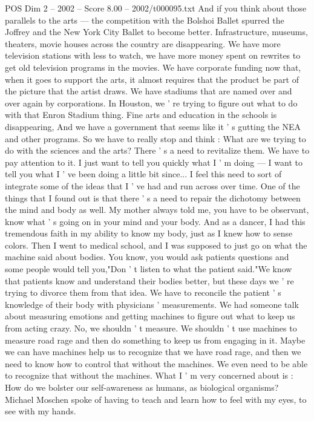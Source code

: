 \begin{textsample}{POS Dim 2 – 2002 – Score 8.00 – 2002/t000095.txt}
And if you think about those parallels to the arts — the competition with the Bolshoi Ballet spurred the Joffrey and the New York City Ballet to become better.
Infrastructure, museums, theaters, movie houses across the country are disappearing.
We have more television stations with less to watch, we have more money spent on rewrites to get old television programs in the movies.
We have corporate funding now that, when it goes to support the arts, it almost requires that the product be part of the picture that the artist draws.
We have stadiums that are named over and over again by corporations.
In Houston, we ' re trying to figure out what to do with that Enron Stadium thing.
Fine arts and education in the schools is disappearing, And we have a government that seems like it ' s gutting the NEA and other programs.
So we have to really stop and think : What are we trying to do with the sciences and the arts?
There ' s a need to revitalize them.
We have to pay attention to it.
I just want to tell you quickly what I ' m doing — I want to tell you what I ' ve been doing a little bit since...
I feel this need to sort of integrate some of the ideas that I ' ve had and run across over time.
One of the things that I found out is that there ' s a need to repair the dichotomy between the mind and body as well.
My mother always told me, you have to be observant, know what ' s going on in your mind and your body.
And as a dancer, I had this tremendous faith in my ability to know my body, just as I knew how to sense colors.
Then I went to medical school, and I was supposed to just go on what the machine said about bodies.
You know, you would ask patients questions and some people would tell you,"Don ' t listen to what the patient said."We know that patients know and understand their bodies better, but these days we ' re trying to divorce them from that idea.
We have to reconcile the patient ' s knowledge of their body with physicians ' measurements.
We had someone talk about measuring emotions and getting machines to figure out what to keep us from acting crazy.
No, we shouldn ' t measure.
We shouldn ' t use machines to measure road rage and then do something to keep us from engaging in it.
Maybe we can have machines help us to recognize that we have road rage, and then we need to know how to control that without the machines.
We even need to be able to recognize that without the machines.
What I ' m very concerned about is : How do we bolster our self-awareness as humans, as biological organisms?
Michael Moschen spoke of having to teach and learn how to feel with my eyes, to see with my hands.

\end{textsample}
